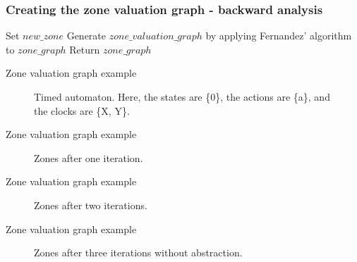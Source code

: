 \documentclass{beamer}
\begin{document}
\begin{frame}[fragile, shrink=20]
  \frametitle{Creating the zone valuation graph - backward analysis}

  \begin{algorithm2e}[H]
    Set $new\_zone$\;
    Generate $zone\_valuation\_graph$ by applying Fernandez' algorithm to $zone\_graph$\;
    Return $zone\_graph$\;
  \end{algorithm2e}

\end{frame}

\begin{frame}{Zone valuation graph example}
  \begin{figure}
    \centering
    \def\svgwidth{0.6\columnwidth}
    
    \caption{Timed automaton. Here, the states are \{0\}, the actions
      are \{a\}, and the clocks are \{X, Y\}.}
  \end{figure}
\end{frame}

\begin{frame}{Zone valuation graph example}
  \begin{figure}
    \centering
    \def\svgwidth{0.4\columnwidth}
    
    \caption{Zones after one iteration.}
  \end{figure}
\end{frame}

\begin{frame}[shrink=20]{Zone valuation graph example}
  \begin{figure}
    \centering
    \def\svgwidth{0.7\columnwidth}
    
    \caption{Zones after two iterations.}
  \end{figure}
\end{frame}

\begin{frame}[shrink=20]{Zone valuation graph example}
  \begin{figure}
    \centering
    \def\svgwidth{0.9\columnwidth}
    
    \caption{Zones after three iterations without abstraction.}
  \end{figure}
\end{frame}
\end{document}
